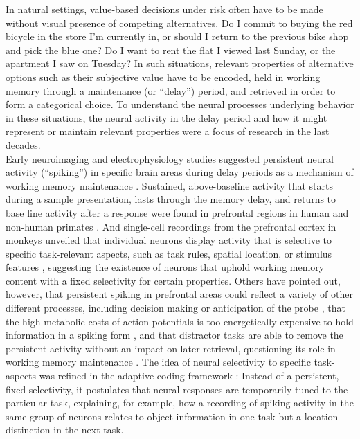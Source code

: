 In natural settings, value-based decisions under risk often have to be made without visual presence of competing alternatives.
Do I commit to buying the red bicycle in the store I'm currently in, or should I return to the previous bike shop and pick the blue one?
Do I want to rent the flat I viewed last Sunday, or the apartment I saw on Tuesday?
In such situations, relevant properties of alternative options such as their subjective value have to be encoded, held in working memory through a maintenance (or ``delay'') period, and retrieved in order to form a categorical choice.
To understand the neural processes underlying behavior in these situations, the neural activity in the delay period and how it might represent or maintain relevant properties were a focus of research in the last decades.\\
Early neuroimaging and electrophysiology studies suggested persistent neural activity (``spiking'') in specific brain areas during delay periods as a mechanism of working memory maintenance \citep{goldman1995cellular}.
Sustained, above-baseline activity that starts during a sample presentation, lasts through the memory delay, and returns to base line activity after a response were found in prefrontal regions in human \citep[e.g.,][]{courtney1997transient} and non-human primates \citep[e.g.,][]{fuster1971neuron, funahashi1989mnemonic, miller1996neural}.
And single-cell recordings from the prefrontal cortex in monkeys unveiled that individual neurons display activity that is selective to specific task-relevant aspects, such as task rules, spatial location, or stimulus features \citep{white1999rule, wallis2001single}, suggesting the existence of neurons that uphold working memory content with a fixed selectivity for certain properties.
Others have pointed out, however, that persistent spiking in prefrontal areas could reflect a variety of other different processes, including decision making \citep{curtis2010beyond} or anticipation of the probe \citep{nobre2011attention}, that the high metabolic costs of action potentials is too energetically expensive to hold information in a spiking form \citep{attwell2001energy}, and that distractor tasks are able to remove the persistent activity without an impact on later retrieval, questioning its role in working memory maintenance \citep{larocque2013decoding, lewis2015neural}.
The idea of neural selectivity to specific task-aspects was refined in the adaptive coding framework \citep{duncan2001adaptive}:
Instead of a persistent, fixed selectivity, it postulates that neural responses are temporarily tuned to the particular task, explaining, for example, how a recording of spiking activity in the same group of neurons relates to object information in one task but a location distinction in the next task.
